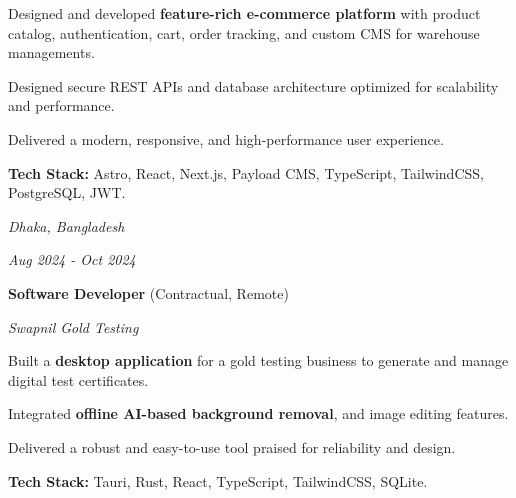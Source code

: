     \begin{onecolentry}
        \begin{highlights}
            \item Designed and developed \textbf{feature-rich e-commerce platform} with product catalog, authentication, cart, order tracking, and custom CMS for warehouse managements.
            \item Designed secure REST APIs and database architecture optimized for scalability and performance.
            \item Delivered a modern, responsive, and high-performance user experience.
            \item  \textbf{Tech Stack:} Astro, React, Next.js, Payload CMS, TypeScript, TailwindCSS, PostgreSQL, JWT.
        \end{highlights}
    \end{onecolentry}



    \begin{twocolentry}{
    \textit{Dhaka, Bangladesh}

    \textit{Aug 2024 - Oct 2024}}
        \textbf{Software Developer} (Contractual, Remote)
        
        \textit{Swapnil Gold Testing}
    \end{twocolentry}

    \vspace{0.10 cm}
    \begin{onecolentry}
        \begin{highlights}
            \item Built a \textbf{desktop application} for a gold testing business to generate and manage digital test certificates.
            \item Integrated \textbf{offline AI-based background removal}, and image editing features.
            \item Delivered a robust and easy-to-use tool praised for reliability and design.
            \item  \textbf{Tech Stack:} Tauri, Rust, React, TypeScript, TailwindCSS, SQLite.
        \end{highlights}
    \end{onecolentry}

